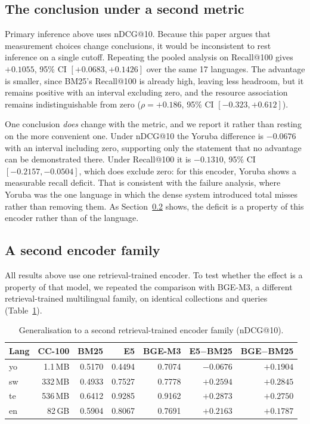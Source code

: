 \documentclass{ijimai_article}
\begin{document}
\subsection{The conclusion under a second metric}
Primary inference above uses nDCG@10. Because this paper argues that measurement
choices change conclusions, it would be inconsistent to rest inference on a single
cutoff. Repeating the pooled analysis on Recall@100 gives $+0.1055$, 95\% CI
$[+0.0683, +0.1426]$ over the same 17 languages. The advantage is smaller, since
BM25's Recall@100 is already high, leaving less headroom, but it remains positive
with an interval excluding zero, and the resource association remains indistinguishable from zero
($\rho = +0.186$, 95\% CI $[-0.323, +0.612]$).

One conclusion \emph{does} change with the metric, and we report it rather than
resting on the more convenient one. Under nDCG@10 the Yoruba difference is $-0.0676$
with an interval including zero, supporting only the statement that no advantage can
be demonstrated there. Under Recall@100 it is $-0.1310$, 95\% CI
$[-0.2157, -0.0504]$, which does exclude zero: for this encoder, Yoruba shows a
measurable recall deficit. That is consistent with the failure analysis, where Yoruba
was the one language in which the dense system introduced total misses rather than
removing them. As Section~\ref{sec:generalise} shows, the deficit is a property of
this encoder rather than of the language.

\subsection{A second encoder family}
\label{sec:generalise}
All results above use one retrieval-trained encoder. To test whether the effect is a
property of that model, we repeated the comparison with BGE-M3, a different
retrieval-trained multilingual family, on identical collections and queries
(Table~\ref{tab:gen}).

\begin{table}[t]
\caption{Generalisation to a second retrieval-trained encoder family (nDCG@10).}
\label{tab:gen}
\centering
\small
\begin{tabular}{lrrrrrr}
\toprule
Lang & CC-100 & BM25 & E5 & BGE-M3 & E5$-$BM25 & BGE$-$BM25 \\
\midrule
yo & 1.1\,MB & 0.5170 & 0.4494 & 0.7074 & $-0.0676$ & $+0.1904$ \\
sw & 332\,MB & 0.4933 & 0.7527 & 0.7778 & $+0.2594$ & $+0.2845$ \\
te & 536\,MB & 0.6412 & 0.9285 & 0.9162 & $+0.2873$ & $+0.2750$ \\
en & 82\,GB & 0.5904 & 0.8067 & 0.7691 & $+0.2163$ & $+0.1787$ \\
\bottomrule
\end{tabular}
\end{table}
\end{document}
